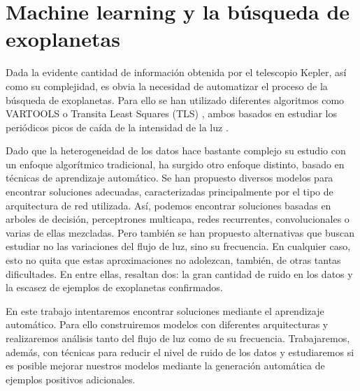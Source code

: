 \section{Machine learning y la búsqueda de exoplanetas}

Dada la evidente cantidad de información obtenida por el telescopio Kepler, así como su complejidad, es obvia la necesidad de automatizar el proceso de la búsqueda de exoplanetas. Para ello se han utilizado diferentes algoritmos como VARTOOLS \cite{2016A&C....17....1H} o Transita Least Squares (TLS) \cite{2019A&A...623A..39H}, ambos basados en estudiar los periódicos picos de caída de la intensidad de la luz \cite{Minsky-1969}.

Dado que la heterogeneidad de los datos hace bastante complejo su estudio con un enfoque algorítmico tradicional, ha surgido otro enfoque distinto, basado en técnicas de aprendizaje automático. Se han propuesto diversos modelos para encontrar soluciones adecuadas, caracterizadas principalmente por el tipo de arquitectura de red utilizada. Así, podemos encontrar soluciones basadas en arboles de decisión, perceptrones multicapa, redes recurrentes, convolucionales o varias de ellas mezcladas. Pero también se han propuesto alternativas que buscan estudiar no las variaciones del flujo de luz, sino su frecuencia. En cualquier caso, esto no quita que estas aproximaciones no adolezcan, también, de otras tantas dificultades. En entre ellas, resaltan dos: la gran cantidad de ruido en los datos y la escasez de ejemplos de exoplanetas confirmados.

En este trabajo intentaremos encontrar soluciones mediante el aprendizaje automático. Para ello construiremos modelos con diferentes arquitecturas y realizaremos análisis tanto del flujo de luz como de su frecuencia. Trabajaremos, además, con técnicas para reducir el nivel de ruido de los datos y estudiaremos si es posible mejorar nuestros modelos mediante la generación automática de ejemplos positivos adicionales.
